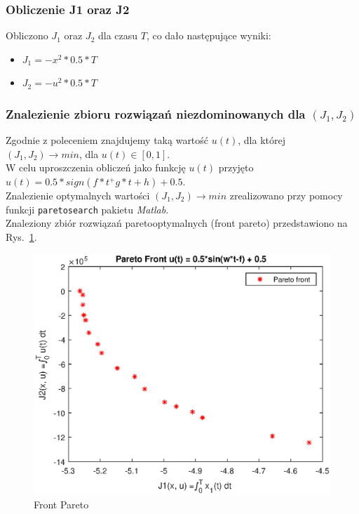 \documentclass[a4paper]{article}
\begin{document}
    
 

\subsubsection{Obliczenie J1 oraz J2}
\label{step:1}
Obliczono $J_1$ oraz $J_2$ dla czasu $T$, co dało następujące wyniki:
\begin{itemize}
    \item $J_1 = - x^2 * 0.5 * T $
    \item $J_2 = - u^2 * 0.5 * T $
\end{itemize}
 
\subsubsection{Znalezienie zbioru rozwiązań niezdominowanych dla $(J_1, J_2)$}
\label{step:2}

Zgodnie z poleceniem znajdujemy taką wartość $u(t)$, dla której $(J_1, J_2) \rightarrow min$, dla $u(t) \in  [0,1]$.
\\
W celu uproszczenia obliczeń jako funkcję $u(t)$ przyjęto $u(t) = 0.5*sign(f*t^ + g*t + h)+0.5$.
\\
Znalezienie optymalnych wartości $(J_1, J_2) \rightarrow min$ zrealizowano przy pomocy funkcji \texttt{paretosearch} pakietu \textit{Matlab}.
\\
Znaleziony zbiór rozwiązań paretooptymalnych (front pareto) przedstawiono na Rys.~\ref{fig:pareto_front}. 
\begin{figure}[H]
    \centering
    \includegraphics{pareto_front.eps}
    \caption{Front Pareto}
    \label{fig:pareto_front}
\end{figure}
\end{document}
